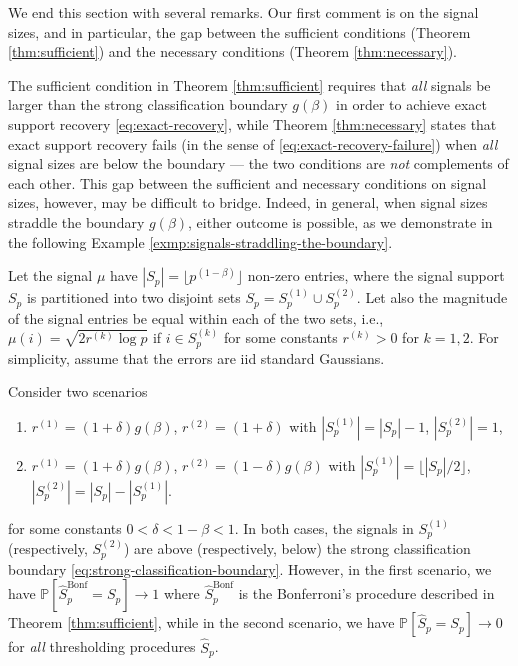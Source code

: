 We end this section with several remarks.
Our first comment is on the signal sizes, and in particular, the gap between the sufficient conditions (Theorem \ref{thm:sufficient}) and the necessary conditions (Theorem \ref{thm:necessary}).

\begin{remark} \label{rmk:gap-between-sufficient-necessary}
The sufficient condition in Theorem \ref{thm:sufficient} requires that \emph{all} signals be larger than the strong classification boundary $g(\beta)$ in order to achieve exact support recovery \eqref{eq:exact-recovery}, while Theorem \ref{thm:necessary} states that exact support recovery fails (in the sense of \eqref{eq:exact-recovery-failure}) when \emph{all} signal sizes are below the boundary --- the two conditions are \emph{not} complements of each other.
This gap between the sufficient and necessary conditions on signal sizes, however, may be difficult to bridge.
Indeed, in general, when signal sizes straddle the boundary $g(\beta)$, either outcome is possible, as we demonstrate 
in the following Example \ref{exmp:signals-straddling-the-boundary}.
\end{remark}

\begin{example}
\label{exmp:signals-straddling-the-boundary}
Let the signal $\mu$ have $|S_p| = \lfloor p^{(1-\beta)} \rfloor$ non-zero entries, where the signal support $S_p$
is partitioned into two disjoint sets $S_p = S_p^{(1)}\cup S_p^{(2)}$. Let also the magnitude of the signal entries
be equal within each of the two sets, i.e., $\mu(i)=\sqrt{2r^{(k)}\log{p}}$ if $i\in S_p^{(k)}$ for some constants $r^{(k)} > 0$ for $k=1,2$. For simplicity, assume that the errors are iid standard Gaussians.

Consider two scenarios
\begin{enumerate}
    \item $r^{(1)} = (1+\delta)g(\beta)$, $r^{(2)} = (1+\delta)$ with $|S_p^{(1)}|=|S_p|-1$, $|S_p^{(2)}|=1$, 
    \item $r^{(1)} = (1+\delta)g(\beta)$, $r^{(2)} = (1-\delta)g(\beta)$ with $|S_p^{(1)}|=\lfloor|S_p|/2\rfloor$, $|S_p^{(2)}|=|S_p| - |S_p^{(1)}|$.
\end{enumerate}
for some constants $0<\delta<1-\beta<1$. 
In both cases, the signals in $S_p^{(1)}$ (respectively, $S_p^{(2)}$) are above (respectively, below) the strong 
classification boundary \eqref{eq:strong-classification-boundary}. However, in the first scenario, we have $\mathbb{P}[\widehat{S}^{\text{Bonf}}_p=S_p]\to 1$ where $\widehat{S}^{\text{Bonf}}_p$ is the Bonferroni's procedure described in Theorem \ref{thm:sufficient}, 
while in the second scenario, we have $\mathbb{P}[\widehat{S}_p=S_p]\to 0$ for \emph{all} thresholding procedures $\widehat{S}_p$.
\end{example}

